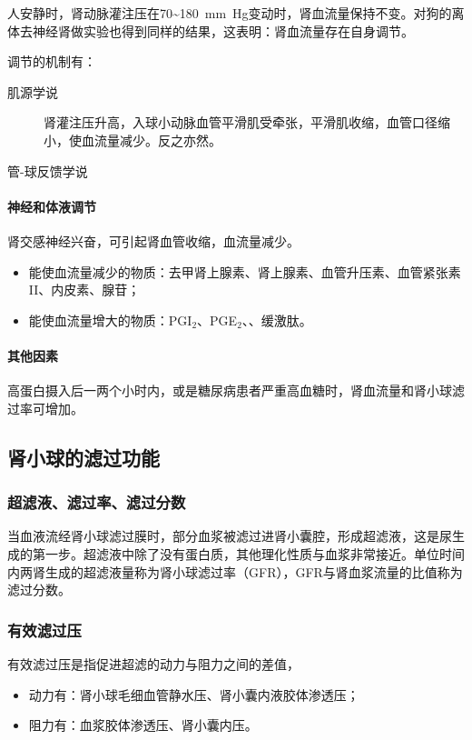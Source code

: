 人安静时，肾动脉灌注压在70\textasciitilde\SI{180}{\mm Hg}变动时，肾血流量保持不变。对狗的离体去神经肾做实验也得到同样的结果，这表明：肾血流量存在自身调节。

调节的机制有：
\begin{description}
	\item[肌源学说] 肾灌注压升高，入球小动脉血管平滑肌受牵张，平滑肌收缩，血管口径缩小，使血流量减少。反之亦然。
	\item[管-球反馈学说]
\end{description}

\paragraph{神经和体液调节}

肾交感神经兴奋，可引起肾血管收缩，血流量减少。
\begin{itemize}
	\item 能使血流量减少的物质：去甲肾上腺素、肾上腺素、血管升压素、血管紧张素II、内皮素、腺苷；
	\item 能使血流量增大的物质：PGI$_2$、PGE$_2$、、缓激肽。
\end{itemize}

\paragraph{其他因素}

高蛋白摄入后一两个小时内，或是糖尿病患者严重高血糖时，肾血流量和肾小球滤过率可增加。

\subsection{肾小球的滤过功能}

\subsubsection{超滤液、滤过率、滤过分数}
当血液流经肾小球滤过膜时，部分血浆被滤过进肾小囊腔，形成超滤液，这是尿生成的第一步。超滤液中除了没有蛋白质，其他理化性质与血浆非常接近。单位时间内两肾生成的超滤液量称为肾小球滤过率（GFR），GFR与肾血浆流量的比值称为滤过分数。

\subsubsection{有效滤过压}

有效滤过压是指促进超滤的动力与阻力之间的差值，
\begin{itemize}
	\item 动力有：肾小球毛细血管静水压、肾小囊内液胶体渗透压；
	\item 阻力有：血浆胶体渗透压、肾小囊内压。
\end{itemize}


